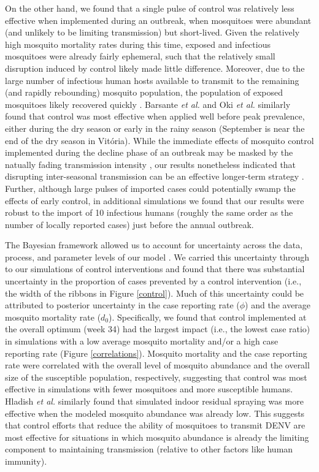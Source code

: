 \documentclass[10pt,letterpaper]{article}
\begin{document}
On the other hand, we found that a single pulse of control was relatively less effective when implemented during an outbreak, when mosquitoes were abundant (and unlikely to be limiting transmission) but short-lived.
Given the relatively high mosquito mortality rates during this time, exposed and infectious mosquitoes were already fairly ephemeral, such that the relatively small disruption induced by control likely made little difference.
Moreover, due to the large number of infectious human hosts available to transmit to the remaining (and rapidly rebounding) mosquito population, the population of exposed mosquitoes likely recovered quickly \cite{Newton1992, Burattini2008}.
Barsante \emph{et al.} \cite{Barsante2015} and Oki \emph{et al.} \cite{Oki2011} similarly found that control was most effective when applied well before peak prevalence, either during the dry season \cite{Barsante2015} or early in the rainy season \cite{Oki2011} (September is near the end of the dry season in Vit\'oria).
While the immediate effects of mosquito control implemented during the decline phase of an outbreak may be masked by the natually fading transmission intensity \cite{Stoddard2014}, our results nonetheless indicated that disrupting inter-seasonal transmission can be an effective longer-term strategy \cite{Hladish2018}.
Further, although large pulses of imported cases could potentially swamp the effects of early control, in additional simulations we found that our results were robust to the import of 10 infectious humans (roughly the same order as the number of locally reported cases) just before the annual outbreak.

The Bayesian framework allowed us to account for uncertainty across the data, process, and parameter levels of our model \cite{Berliner1996}.
We carried this uncertainty through to our simulations of control interventions \cite{Elderd2006} and found that there was substantial uncertainty in the proportion of cases prevented by a control intervention (i.e., the width of the ribbons in Figure \ref{control}).
Much of this uncertainty could be attributed to posterior uncertainty in the case reporting rate ($\phi$) and the average mosquito mortality rate ($d_0$).
Specifically, we found that control implemented at the overall optimum (week 34) had the largest impact (i.e., the lowest case ratio) in simulations with a low average mosquito mortality and/or a high case reporting rate (Figure \ref{correlations}).
Mosquito mortality and the case reporting rate were correlated with the overall level of mosquito abundance and the overall size of the susceptible population, respectively, suggesting that control was most effective in simulations with fewer mosquitoes and more susceptible humans.  
Hladish \emph{et al.} \cite{Hladish2018} similarly found that simulated indoor residual spraying was more effective when the modeled mosquito abundance was already low.
This suggests that control efforts that reduce the ability of mosquitoes to transmit DENV are most effective for situations in which mosquito abundance is already the limiting component to maintaining transmission (relative to other factors like human immunity).
\end{document}
